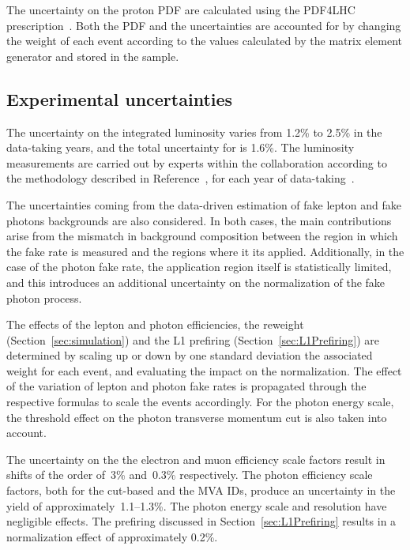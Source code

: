The uncertainty on the proton PDF are calculated using the PDF4LHC prescription~\cite{Butterworth:2015oua,Alekhin:2011sk}.
Both the PDF and the \alpS uncertainties are accounted for by changing the
weight of each event according to the values calculated by the matrix element
generator and stored in the sample.

\subsection{Experimental uncertainties}
The uncertainty on the integrated luminosity varies from 1.2\usep\% to 2.5\usep\% in the data-taking years, and the total uncertainty for \RunII{} is 1.6\usep\%.
The luminosity measurements are carried out by experts within the collaboration according to the methodology described in Reference~\cite{CMS-LUM-17-003},
for each year of data-taking~\cite{CMS-LUM-17-004, CMS-LUM-18-002}.


The uncertainties coming from the data-driven estimation of fake lepton and fake photons backgrounds are also considered.
In both cases, the main contributions arise from the mismatch in background composition between the region in which the fake rate is measured and the regions where it its applied.
Additionally, in the case of the photon fake rate, the application region itself is statistically limited, and this introduces an additional uncertainty on the normalization of the fake photon process.

The effects of the lepton and photon efficiencies, the \pileup{} reweight (Section~\ref{sec:simulation})
and the L1 prefiring (Section~\ref{sec:L1Prefiring})
are determined by scaling up or down by one standard deviation the associated weight for each event,
and evaluating the impact on the normalization.
The effect of the variation of lepton and photon fake rates is propagated through the
respective formulas to scale the events accordingly.
For the photon energy scale, the threshold effect on the photon transverse momentum cut
is also taken into account.

The uncertainty on the the electron and muon efficiency scale factors
result in shifts of the order of~3\usep\% and~0.3\usep\% respectively.
The photon efficiency scale factors, both for the cut-based and the MVA IDs,
produce an uncertainty in the yield of approximately~1.1--1.3\usep\%.
The photon energy scale and resolution have negligible effects.
The \Lone prefiring discussed in Section~\ref{sec:L1Prefiring}
results in a normalization effect of approximately 0.2\usep\%.

